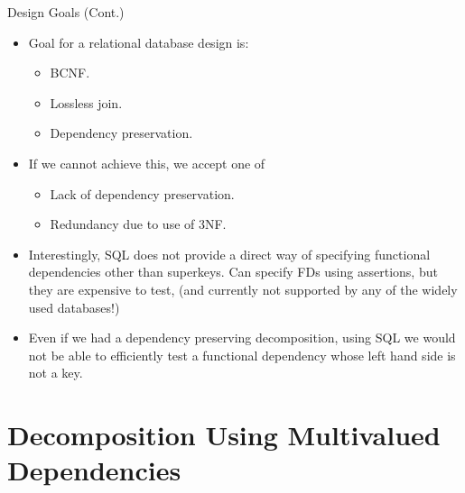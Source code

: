 \documentclass{beamer}
\begin{document}
\begin{frame}{Design Goals (Cont.)}
    \begin{itemize}
        \item Goal for a relational database design is:
            \begin{itemize}
                \item BCNF.
                \item Lossless join.
                \item Dependency preservation.
            \end{itemize}
        \item If we cannot achieve this, we accept one of
            \begin{itemize}
                \item Lack of dependency preservation.
                \item Redundancy due to use of 3NF.
            \end{itemize}
        \item Interestingly, SQL does not provide a direct way of specifying functional dependencies other than superkeys. Can specify FDs using assertions, but they are expensive to test, (and currently not supported by any of the widely used databases!)
        \item Even if we had a dependency preserving decomposition, using SQL we would not be able to efficiently test a functional dependency whose left hand side is not a key.
    \end{itemize}
\end{frame}

\section{Decomposition Using Multivalued Dependencies}
\end{document}
